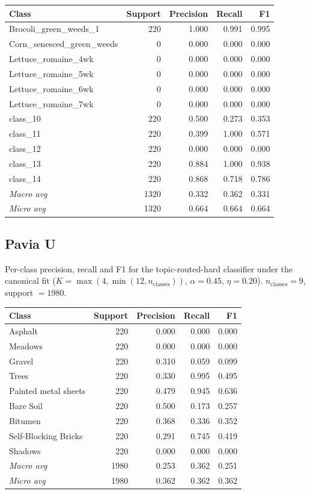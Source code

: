 \begin{tabular}{lrrrr}
\toprule
Class & Support & Precision & Recall & F1 \\
\midrule
Brocoli\_green\_weeds\_1 & 220 & 1.000 & 0.991 & 0.995 \\
Corn\_senesced\_green\_weeds & 0 & 0.000 & 0.000 & 0.000 \\
Lettuce\_romaine\_4wk & 0 & 0.000 & 0.000 & 0.000 \\
Lettuce\_romaine\_5wk & 0 & 0.000 & 0.000 & 0.000 \\
Lettuce\_romaine\_6wk & 0 & 0.000 & 0.000 & 0.000 \\
Lettuce\_romaine\_7wk & 0 & 0.000 & 0.000 & 0.000 \\
class\_10 & 220 & 0.500 & 0.273 & 0.353 \\
class\_11 & 220 & 0.399 & 1.000 & 0.571 \\
class\_12 & 220 & 0.000 & 0.000 & 0.000 \\
class\_13 & 220 & 0.884 & 1.000 & 0.938 \\
class\_14 & 220 & 0.868 & 0.718 & 0.786 \\
\midrule
\textit{Macro avg} & 1320 & 0.332 & 0.362 & 0.331 \\
\textit{Micro avg} & 1320 & 0.664 & 0.664 & 0.664 \\
\bottomrule
\end{tabular}

\subsection*{Pavia U}
Per-class precision, recall and F1 for the topic-routed-hard classifier under the canonical fit ($K = \max(4, \min(12, n_{\text{classes}}))$, $\alpha = 0.45$, $\eta = 0.20$). $n_{\text{classes}} = 9$, support $= 1980$.

\begin{tabular}{lrrrr}
\toprule
Class & Support & Precision & Recall & F1 \\
\midrule
Asphalt & 220 & 0.000 & 0.000 & 0.000 \\
Meadows & 220 & 0.000 & 0.000 & 0.000 \\
Gravel & 220 & 0.310 & 0.059 & 0.099 \\
Trees & 220 & 0.330 & 0.995 & 0.495 \\
Painted metal sheets & 220 & 0.479 & 0.945 & 0.636 \\
Bare Soil & 220 & 0.500 & 0.173 & 0.257 \\
Bitumen & 220 & 0.368 & 0.336 & 0.352 \\
Self-Blocking Bricks & 220 & 0.291 & 0.745 & 0.419 \\
Shadows & 220 & 0.000 & 0.000 & 0.000 \\
\midrule
\textit{Macro avg} & 1980 & 0.253 & 0.362 & 0.251 \\
\textit{Micro avg} & 1980 & 0.362 & 0.362 & 0.362 \\
\bottomrule
\end{tabular}

